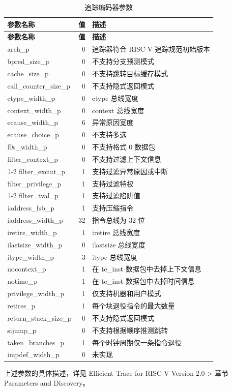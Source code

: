 \documentclass[main\_\_CN.tex]{subfiles}
\begin{document}
\begin{longtable}[c]{ |l|r|l| }
    \caption{追踪编码器参数}
    \label{tab:encoder_parameters}
    \\\hline
    \rowcolor{lightgray}
    \textbf{参数名称} & \textbf{值} & \textbf{描述} \\\hline
    \endfirsthead

    \hline
    \rowcolor{lightgray}
    \textbf{参数名称} & \textbf{值} & \textbf{描述} \\\hline
    \endhead
    \endfoot
    \endlastfoot

    arch\_p & 0 & 追踪器符合 RISC-V 追踪规范初始版本  \\\hline
    bpred\_size\_p & 0 & 不支持分支预测模式 \\\hline
    cache\_size\_p & 0 & 不支持跳转目标缓存模式 \\\hline
    call\_counter\_size\_p & 0 & 不支持隐式返回模式 \\\hline
    ctype\_width\_p & 0 & ctype 总线宽度 \\\hline
    context\_width\_p & 0 & context 总线宽度 \\\hline
    ecause\_width\_p & 6 & 异常原因宽度 \\\hline
    ecause\_choice\_p & 0 & 不支持多选 \\\hline
    f0s\_width\_p & 0 & 不支持格式 0 数据包 \\\hline
    filter\_context\_p & 0 & 不支持过滤上下文信息 \\\cline{1-2}
    filter\_excint\_p & 1 & 支持过滤异常原因或中断 \\\hline
    filter\_privilege\_p & 1 & 支持过滤特权 \\\cline{1-2}
    filter\_tval\_p & 1 & 支持过滤陷阱值 \\\hline
    iaddress\_lsb\_p & 1 & 支持压缩指令 \\\hline
    iaddress\_width\_p & 32 & 指令总线为 32 位 \\\hline
    iretire\_width\_p & 1 & iretire 总线宽度 \\\hline
    ilastsize\_width\_p & 0 & ilastsize 总线宽度 \\\hline
    itype\_width\_p & 3 & itype 总线宽度  \\\hline
    nocontext\_p & 1 & 在 te\_inst 数据包中去掉上下文信息 \\\hline
    notime\_p & 1 & 在 te\_inst 数据包中去掉时间信息 \\\hline
    privilege\_width\_p & 1 & 仅支持机器和用户模式 \\\hline
    retires\_p & 1 & 每个块退役指令的最大数量 \\\hline
    return\_stack\_size\_p & 0 & 不支持隐式返回模式 \\\hline
    sijump\_p & 0 & 不支持根据顺序推测跳转 \\\hline
    taken\_branches\_p & 1 & 每个时钟周期仅一条指令退役 \\\hline
    impdef\_width\_p & 0 & 未实现 \\\hline

 \end{longtable}
上述参数的具体描述，详见 Efficient Trace for RISC-V Version 2.0 > 章节 Parameters and Discovery。
\end{document}
